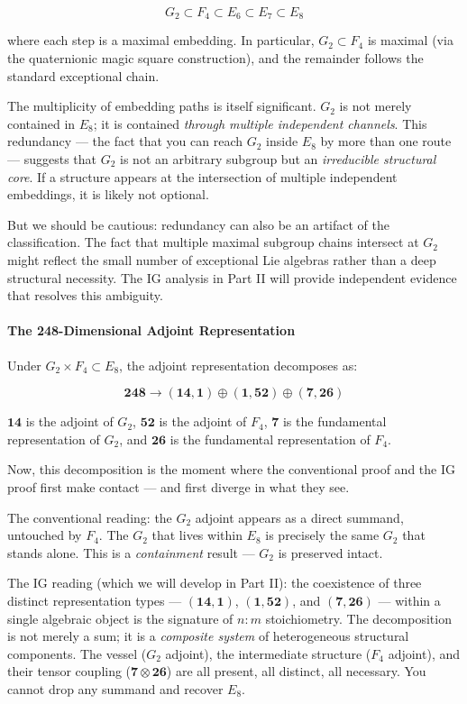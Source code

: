 \documentclass[12pt,a4paper]{article}
\begin{document}
\[G_2 \subset F_4 \subset E_6 \subset E_7 \subset E_8\]

where each step is a maximal embedding. In particular, $G_2 \subset F_4$ is maximal (via the quaternionic magic square construction), and the remainder follows the standard exceptional chain.

The multiplicity of embedding paths is itself significant. $G_2$ is not merely contained in $E_8$; it is contained \emph{through multiple independent channels}. This redundancy --- the fact that you can reach $G_2$ inside $E_8$ by more than one route --- suggests that $G_2$ is not an arbitrary subgroup but an \emph{irreducible structural core}. If a structure appears at the intersection of multiple independent embeddings, it is likely not optional.

But we should be cautious: redundancy can also be an artifact of the classification. The fact that multiple maximal subgroup chains intersect at $G_2$ might reflect the small number of exceptional Lie algebras rather than a deep structural necessity. The IG analysis in Part II will provide independent evidence that resolves this ambiguity.

\paragraph{The 248-Dimensional Adjoint Representation}

Under $G_2 \times F_4 \subset E_8$, the adjoint representation decomposes as:

\[\mathbf{248} \to (\mathbf{14}, \mathbf{1}) \oplus (\mathbf{1}, \mathbf{52}) \oplus (\mathbf{7}, \mathbf{26})\]

$\mathbf{14}$ is the adjoint of $G_2$, $\mathbf{52}$ is the adjoint of $F_4$, $\mathbf{7}$ is the fundamental representation of $G_2$, and $\mathbf{26}$ is the fundamental representation of $F_4$.

Now, this decomposition is the moment where the conventional proof and the IG proof first make contact --- and first diverge in what they see.

The conventional reading: the $G_2$ adjoint appears as a direct summand, untouched by $F_4$. The $G_2$ that lives within $E_8$ is precisely the same $G_2$ that stands alone. This is a \emph{containment} result --- $G_2$ is preserved intact.

The IG reading (which we will develop in Part II): the coexistence of three distinct representation types --- $(\mathbf{14}, \mathbf{1})$, $(\mathbf{1}, \mathbf{52})$, and $(\mathbf{7}, \mathbf{26})$ --- within a single algebraic object is the signature of $n{:}m$ stoichiometry. The decomposition is not merely a sum; it is a \emph{composite system} of heterogeneous structural components. The vessel ($G_2$ adjoint), the intermediate structure ($F_4$ adjoint), and their tensor coupling ($\mathbf{7} \otimes \mathbf{26}$) are all present, all distinct, all necessary. You cannot drop any summand and recover $E_8$.
\end{document}
